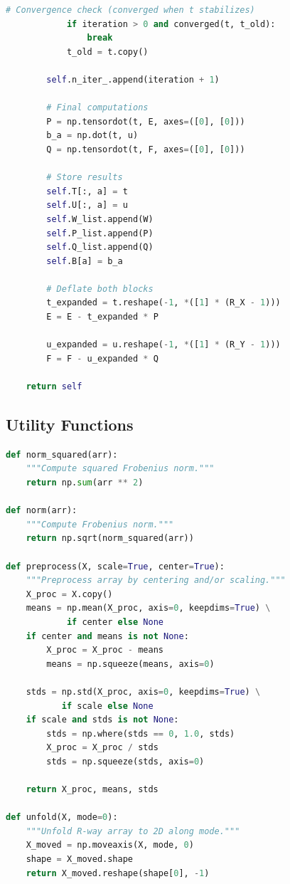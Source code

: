 \documentclass[12pt,a4paper]{article}
\begin{document}
\begin{lstlisting}[language=Python, basicstyle=\ttfamily\tiny, breaklines=true]
            # Convergence check (converged when t stabilizes)
            if iteration > 0 and converged(t, t_old):
                break
            t_old = t.copy()

        self.n_iter_.append(iteration + 1)

        # Final computations
        P = np.tensordot(t, E, axes=([0], [0]))
        b_a = np.dot(t, u)
        Q = np.tensordot(t, F, axes=([0], [0]))

        # Store results
        self.T[:, a] = t
        self.U[:, a] = u
        self.W_list.append(W)
        self.P_list.append(P)
        self.Q_list.append(Q)
        self.B[a] = b_a

        # Deflate both blocks
        t_expanded = t.reshape(-1, *([1] * (R_X - 1)))
        E = E - t_expanded * P

        u_expanded = u.reshape(-1, *([1] * (R_Y - 1)))
        F = F - u_expanded * Q

    return self
\end{lstlisting}

\subsection{Utility Functions}

\begin{lstlisting}[language=Python]
def norm_squared(arr):
    """Compute squared Frobenius norm."""
    return np.sum(arr ** 2)

def norm(arr):
    """Compute Frobenius norm."""
    return np.sqrt(norm_squared(arr))

def preprocess(X, scale=True, center=True):
    """Preprocess array by centering and/or scaling."""
    X_proc = X.copy()
    means = np.mean(X_proc, axis=0, keepdims=True) \
            if center else None
    if center and means is not None:
        X_proc = X_proc - means
        means = np.squeeze(means, axis=0)

    stds = np.std(X_proc, axis=0, keepdims=True) \
           if scale else None
    if scale and stds is not None:
        stds = np.where(stds == 0, 1.0, stds)
        X_proc = X_proc / stds
        stds = np.squeeze(stds, axis=0)

    return X_proc, means, stds

def unfold(X, mode=0):
    """Unfold R-way array to 2D along mode."""
    X_moved = np.moveaxis(X, mode, 0)
    shape = X_moved.shape
    return X_moved.reshape(shape[0], -1)
\end{lstlisting}
\end{document}
